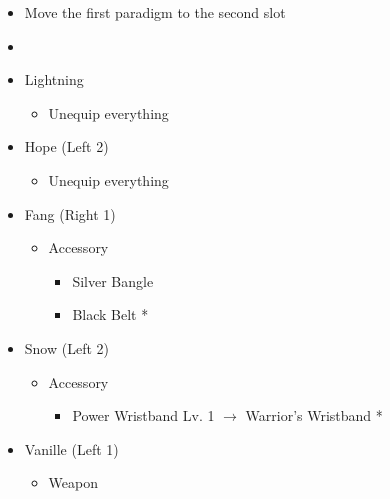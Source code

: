 \documentclass{report}
\begin{document}
\begin{menu}
\begin{itemize}
    \paradigm
    \begin{itemize}
        \item Move the first paradigm to the second slot
        \item {}%
{\paradigmline{(\syn)}{\sab}{\rav}}%
{\paradigmline{\com}{\med}{\com}}%
{\paradigmline{\textit{\syn}}{\textit{\med}}{\textit{\com}}}%
{\paradigmline{\com}{\sab}{\com}}%
{\paradigmline{\syn}{\sab}{\com}}%
{\paradigmline{\com}{\rav}{\com}}
    \end{itemize}
    \equip
    \begin{itemize}
        \item Lightning
        \begin{itemize}
            \item Unequip everything
        \end{itemize}
        \item Hope (Left 2)
        \begin{itemize}
            \item Unequip everything
        \end{itemize}
        \item Fang (Right 1)
        \begin{itemize}
            \item Accessory
            \begin{itemize}
                \item Silver Bangle
                \item Black Belt *
            \end{itemize}
        \end{itemize}
        \item Snow (Left 2)
        \begin{itemize}
            \item Accessory
            \begin{itemize}
                \item Power Wristband Lv. 1 $\rightarrow$ Warrior's Wristband *
            \end{itemize}
        \end{itemize}
        \item Vanille (Left 1)
        \begin{itemize}
            \item Weapon
            \begin{itemize}

\end{itemize}
\end{itemize}
\end{itemize}
\end{itemize}
\end{menu}
\end{document}
